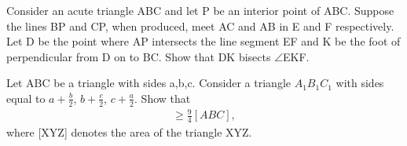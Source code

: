 \item Consider an acute triangle ABC and let P be an interior point of ABC. Suppose the lines BP and CP, when produced, meet AC and AB in E and F respectively. Let D be the point where AP intersects the line segment EF and K be the foot of perpendicular from D on to BC. Show that DK bisects $\angle$EKF.

\item Let ABC be a triangle with sides a,b,c. Consider a triangle $A_1B_1C_1$ with sides equal to 
$a + \frac{b}{2}$, $b + \frac{c}{2}$, $c + \frac{a}{2}$. Show that
\begin{align*}
[A_1B_1C_1] \geq \frac{9}{4}[ABC],
\end{align*}
where [XYZ] denotes the area of the triangle XYZ.























